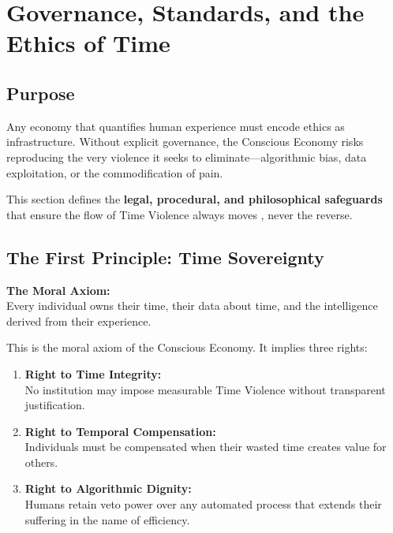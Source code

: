 
\section{Governance, Standards, and the Ethics of Time}
\label{sec:governance}

\subsection{Purpose}
\label{sec:governance-purpose}

Any economy that quantifies human experience must encode ethics as infrastructure. Without explicit governance, the Conscious Economy risks reproducing the very violence it seeks to eliminate—algorithmic bias, data exploitation, or the commodification of pain.

This section defines the \textbf{legal, procedural, and philosophical safeguards} that ensure the flow of Time Violence always moves , never the reverse.

\subsection{The First Principle: Time Sovereignty}
\label{sec:time-sovereignty}

\begin{ethicalprinciple}
\textbf{The Moral Axiom:}\\
Every individual owns their time, their data about time, and the intelligence derived from their experience.
\end{ethicalprinciple}

This is the moral axiom of the Conscious Economy. It implies three rights:

\begin{enumerate}
    \item \textbf{Right to Time Integrity:}\\
    No institution may impose measurable Time Violence without transparent justification.
    
    \item \textbf{Right to Temporal Compensation:}\\
    Individuals must be compensated when their wasted time creates value for others.
    
    \item \textbf{Right to Algorithmic Dignity:}\\
    Humans retain veto power over any automated process that extends their suffering in the name of efficiency.
\end{enumerate}

